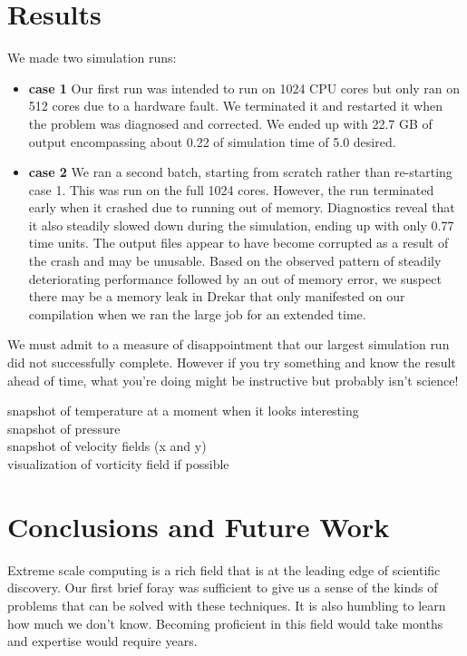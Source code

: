 \documentclass[11pt]{article} %
\begin{document}
\section{Results}
We made two simulation runs:
\begin{itemize}
\item{\textbf{case 1}} Our first run was intended to run on 1024 CPU cores but only ran on 512 cores due to a hardware fault.
We terminated it and restarted it when the problem was diagnosed and corrected.  We ended up with 22.7 GB of output
encompassing about 0.22 of simulation time of 5.0 desired.
\item{\textbf{case 2}} We ran a second batch, starting from scratch rather than re-starting case 1.
This was run on the full 1024 cores.  However, the run terminated early when it crashed due to running out of memory.
Diagnostics reveal that it also steadily slowed down during the simulation, ending up with only 0.77 time units.
The output files appear to have become corrupted as a result of the crash and may be unusable.
Based on the observed pattern of steadily deteriorating performance followed by an out of memory error,
we suspect there may be a memory leak in Drekar that only manifested on our compilation when we ran
the large job for an extended time.
\end{itemize}

We must admit to a measure of disappointment that our largest simulation run did not successfully complete.
However if you try something and know the result ahead of time, 
what you're doing might be instructive but probably isn't science!

snapshot of temperature at a moment when it looks interesting \\
snapshot of pressure \\
snapshot of velocity fields (x and y) \\
visualization of vorticity field if possible

\section{Conclusions and Future Work}
Extreme scale computing is a rich field that is at the leading edge of scientific discovery.
Our first brief foray was sufficient to give us a sense of the kinds of problems that can
be solved with these techniques.  
It is also humbling to learn how much we don't know.  
Becoming proficient in this field would take months and expertise would require years.
\end{document}
